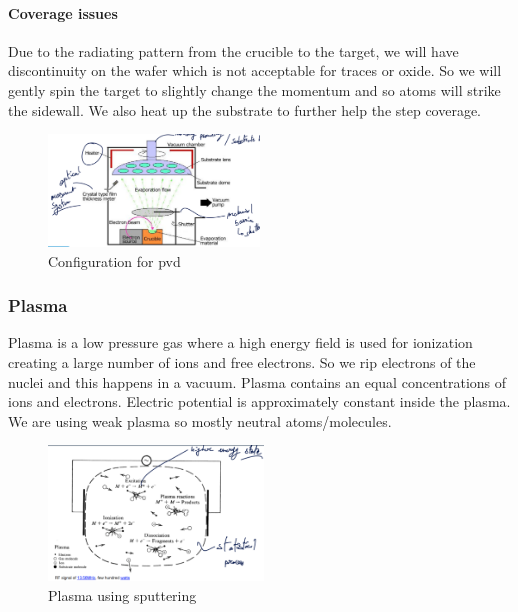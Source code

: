 \documentclass[
]{article}
\begin{document}
\hypertarget{coverage-issues}{%
\paragraph{Coverage issues}\label{coverage-issues}}

Due to the radiating pattern from the crucible to the target, we will
have discontinuity on the wafer which is not acceptable for traces or
oxide. So we will gently spin the target to slightly change the momentum
and so atoms will strike the sidewall. We also heat up the substrate to
further help the step coverage.

\begin{figure}
\hypertarget{fig:pvd-conf-label}{%
\centering
\includegraphics[width=0.5\textwidth,height=\textheight]{config_PVD.png}
\caption{Configuration for {pvd}}\label{fig:pvd-conf-label}
}
\end{figure}

\hypertarget{plasma}{%
\subsubsection{Plasma}\label{plasma}}

Plasma is a low pressure gas where a high energy field is used for
ionization creating a large number of ions and free electrons. So we rip
electrons of the nuclei and this happens in a vacuum. Plasma contains an
equal concentrations of ions and electrons. Electric potential is
approximately constant inside the plasma. We are using weak plasma so
mostly neutral atoms/molecules.

\begin{figure}
\hypertarget{fig:plasma-sputtering-label}{%
\centering
\includegraphics[width=0.51\textwidth,height=\textheight]{plasma.png}
\caption{Plasma using sputtering}\label{fig:plasma-sputtering-label}
}
\end{figure}
\end{document}
